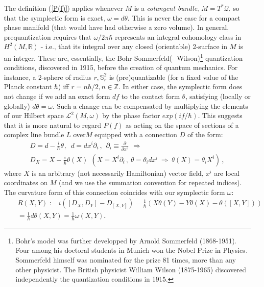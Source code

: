 The definition (\ref{P(f)}) applies whenever $M$ is a {\it cotangent bundle}, 
$M = T^*\mathcal{Q}$, so that the symplectic form is exact, $\omega = d\theta$.
 This is never the case for a compact phase manifold (that would have had 
otherwise a zero volume). In general, prequantization requires that 
$\omega/{2\pi\hbar}$ represents an integral cohomology class in 
$H^2(M,\mathbb{R})$ - i.e., that its integral over any closed (orientable) 
2-surface in $M$ is an integer. These are, essentially, the Bohr-Sommerfeld(-
Wilson)\footnote{Bohr's model was further developped by Arnold Sommerfeld 
(1868-1951). Four among his doctoral students in Munich won the Nobel Prize in 
Physics. Sommerfeld himself was nominated for the prize 81 times, more than any
 other physicist. The British physicist William Wilson (1875-1965) discovered 
independently the quantization conditions in 1915.} quantization conditions, 
discovered in 1915, before the creation of quantum mechanics. For instance, a 
2-sphere of radius $r, {\mathbb S}_r^2$ is (pre)quantizable (for a fixed value 
of the Planck constant $\hbar$) iff $r = n\hbar/2, n\in \mathbb Z$. In either 
case, the symplectic form does not change if we add  an exact form $df$ to the 
contact form  $\theta$, satisfying (locally or globally) $d\theta = \omega$. 
Such a change can be compensated by multiplying the elements of our Hilbert 
space ${\mathcal L}^2(M, \omega)$ by the phase factor $exp(if/\hbar)$. This 
suggests that it is more natural to regard $P(f)$ as acting on the space of 
sections of a complex line bundle $L$ over$M$ equipped with a connection $D$ of 
the form:
\begin{eqnarray}
\label{D}
D = d-\frac{i}{\hbar} \theta\,, \ \ d = dx^i \partial_i\,, \ \ \partial_i 
\equiv \frac{\partial}{\partial{x^i}}\ \ \Rightarrow \nonumber \\
D_X = X - \frac{i}{\hbar} \theta(X) \ \ (X=X^i\partial_i\,,\ \theta=\theta_i 
dx^i\ \Rightarrow\ \theta(X)=\theta_i X^i)\,,
\end{eqnarray}
where $X$ is an arbitrary (not necessarily Hamiltonian) vector field, $x^i$ are
 local coordinates on $M$ (and we use the summation convention for repeated 
indices). The curvature form of this connection coincides with our symplectic 
form $\omega$:
\begin{eqnarray}
\label{RD}
&&R(X,Y):=i([D_X, D_Y]-D_{[X,Y]})=\frac{1}{\hbar}(X\theta(Y)-Y\theta(X)-
\theta([X, Y])) \nonumber \\ &&=\frac{1}{\hbar} d\theta(X,Y)= \frac{1}{\hbar} 
\omega(X,Y).
\end{eqnarray}

